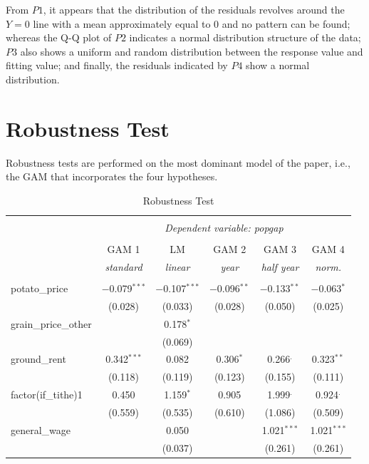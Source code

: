 From $P1$, it appears that the distribution of the residuals revolves around the $Y=0$ line with a mean approximately equal to 0 and no pattern can be found; whereas the Q-Q plot of $P2$ indicates a normal distribution structure of the data; $P3$ also shows a uniform and random distribution between the response value and fitting value; and finally, the residuals indicated by $P4$ show a normal distribution.


\section{Robustness Test}

Robustness tests are performed on the most dominant model of the paper, i.e., the GAM that incorporates the four hypotheses.

\begin{table}[h]
    \centering
    \caption{Robustness Test}
    \begin{tabular}{@{\extracolsep{5pt}}lccccc}
    \\[-1.8ex]\hline
    \hline \\[-1.8ex]
    & \multicolumn{5}{c}{\textit{Dependent variable: popgap}} \\
    \cline{2-6}
    \\[-1.8ex] & GAM 1 & LM & GAM 2 & GAM 3 & GAM 4 \\
    & \textit{standard} & \textit{linear} & \textit{year} & \textit{half year} & \textit{norm.} \\
    \hline \\[-1.8ex]
    potato\_price & $-$0.079$^{***}$ & $-$0.107$^{***}$ & $-$0.096$^{**}$ & $-$0.133$^{**}$ & $-$0.063$^{*}$ \\
     & (0.028) & (0.033) & (0.028) & (0.050) & (0.025) \\
    grain\_price\_other & & 0.178$^{*}$ &  & & \\
     & & (0.069) &  & & \\
    ground\_rent & 0.342$^{***}$ & 0.082 & 0.306$^{*}$ & 0.266$^{.}$ & 0.323$^{**}$ \\
     & (0.118) & (0.119) & (0.123) & (0.155) & (0.111) \\
    factor(if\_tithe)1 & 0.450 & 1.159$^{*}$ & 0.905 & 1.999$^{.}$ & 0.924$^{.}$ \\
     & (0.559) & (0.535) & (0.610) & (1.086) & (0.509) \\
    general\_wage & & 0.050 & & 1.021$^{***}$ & 1.021$^{***}$ \\
     & & (0.037) & & (0.261) & (0.261) \\

\end{tabular}
\end{table}
